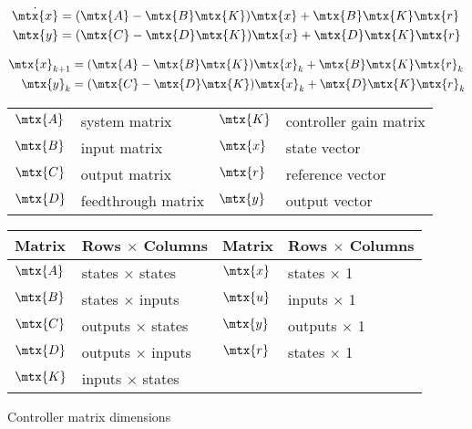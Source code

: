\begin{theorem}

  \begin{align}
    \dot{\mtx{x}} &= (\mtx{A} - \mtx{B}\mtx{K})\mtx{x} + \mtx{B}\mtx{K}\mtx{r}
      \label{eq:s_ref_ctrl_x} \\
    \mtx{y} &= (\mtx{C} - \mtx{D}\mtx{K})\mtx{x} + \mtx{D}\mtx{K}\mtx{r}
  \end{align}

  \begin{align}
    \mtx{x}_{k+1} &= (\mtx{A} - \mtx{B}\mtx{K})\mtx{x}_k +
      \mtx{B}\mtx{K}\mtx{r}_k \label{eq:z_ref_ctrl_x} \\
    \mtx{y}_k &= (\mtx{C} - \mtx{D}\mtx{K})\mtx{x}_k + \mtx{D}\mtx{K}\mtx{r}_k
  \end{align}

  \begin{figurekey}
    \begin{tabular}{llll}
      $\mtx{A}$ & system matrix      & $\mtx{K}$ & controller gain matrix \\
      $\mtx{B}$ & input matrix       & $\mtx{x}$ & state vector \\
      $\mtx{C}$ & output matrix      & $\mtx{r}$ & \gls{reference} vector \\
      $\mtx{D}$ & feedthrough matrix & $\mtx{y}$ & output vector \\
    \end{tabular}
  \end{figurekey}
\end{theorem}

\begin{booktable}
  \begin{tabular}{|ll|ll|}
    \hline
    \rowcolor{headingbg}
    \textbf{Matrix} & \textbf{Rows $\times$ Columns} &
    \textbf{Matrix} & \textbf{Rows $\times$ Columns} \\
    \hline
    $\mtx{A}$ & states $\times$ states & $\mtx{x}$ & states $\times$ 1 \\
    $\mtx{B}$ & states $\times$ inputs & $\mtx{u}$ & inputs $\times$ 1 \\
    $\mtx{C}$ & outputs $\times$ states & $\mtx{y}$ & outputs $\times$ 1 \\
    $\mtx{D}$ & outputs $\times$ inputs & $\mtx{r}$ & states $\times$ 1 \\
    $\mtx{K}$ & inputs $\times$ states &  &  \\
    \hline
  \end{tabular}
  \caption{Controller matrix dimensions}
\end{booktable}

